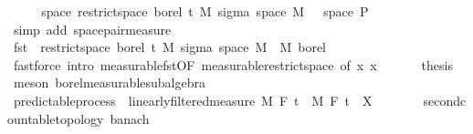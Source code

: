 \begin{isabellebody}
\ \ \isamarkupfalse%
\ \isamarkupfalse%
\ {\isachardoublequoteopen}space\ {\isacharparenleft}{\kern0pt}restrict{\isacharunderscore}{\kern0pt}space\ borel\ {\isacharbraceleft}{\kern0pt}t\ {\isasymOtimes}\isactrlsub M\ sigma\ {\isacharparenleft}{\kern0pt}space\ M{\isacharparenright}{\kern0pt}\ {\isacharbraceleft}{\kern0pt}{\isacharbraceright}{\kern0pt}{\isacharparenright}{\kern0pt}\ {\isacharequal}{\kern0pt}\ space\ {\isasymSigma}\isactrlsub P{\isachardoublequoteclose}\ \isamarkupfalse%
\ {\isacharparenleft}{\kern0pt}simp\ add{\isacharcolon}{\kern0pt}\ space{\isacharunderscore}{\kern0pt}pair{\isacharunderscore}{\kern0pt}measure{\isacharparenright}{\kern0pt}\isanewline
\ \ \isamarkupfalse%
\ \isamarkupfalse%
\ {\isachardoublequoteopen}fst\ {\isasymin}\ restrict{\isacharunderscore}{\kern0pt}space\ borel\ {\isacharbraceleft}{\kern0pt}t\ {\isasymOtimes}\isactrlsub M\ sigma\ {\isacharparenleft}{\kern0pt}space\ M{\isacharparenright}{\kern0pt}\ {\isacharbraceleft}{\kern0pt}{\isacharbraceright}{\kern0pt}\ {\isasymrightarrow}\isactrlsub M\ borel{\isachardoublequoteclose}\ \isamarkupfalse%
\ {\isacharparenleft}{\kern0pt}fastforce\ intro{\isacharcolon}{\kern0pt}\ measurable{\isacharunderscore}{\kern0pt}fst{\isacharprime}{\kern0pt}{\isacharprime}{\kern0pt}{\isacharbrackleft}{\kern0pt}OF\ measurable{\isacharunderscore}{\kern0pt}restrict{\isacharunderscore}{\kern0pt}space{}{\isacharcomma}{\kern0pt}\ of\ {\isachardoublequoteopen}{\isasymlambda}x{\isachardot}{\kern0pt}\ x{\isachardoublequoteclose}{\isacharbrackright}{\kern0pt}{\isacharparenright}{\kern0pt}\ \isanewline
\ \ \isamarkupfalse%
\ \isamarkupfalse%
\ {\isacharquery}{\kern0pt}thesis\ \isamarkupfalse%
\ {\isacharparenleft}{\kern0pt}meson\ borel{\isacharunderscore}{\kern0pt}measurable{\isacharunderscore}{\kern0pt}subalgebra{\isacharparenright}{\kern0pt}\isanewline
{}\isamarkupfalse%
%
\endisatagproof
{\isafoldproof}%
%
\isadelimproof
\isanewline
%
\endisadelimproof
\isanewline
{}\isamarkupfalse%
\isanewline
\isanewline
{}\isamarkupfalse%
\ predictable{\isacharunderscore}{\kern0pt}process\ {\isacharequal}{\kern0pt}\ linearly{\isacharunderscore}{\kern0pt}filtered{\isacharunderscore}{\kern0pt}measure\ M\ F\ t\ \ M\ F\ t\ \ X\ {\isacharcolon}{\kern0pt}{\isacharcolon}{\kern0pt}\ {\isachardoublequoteopen}{\isacharunderscore}{\kern0pt}\ {\isasymRightarrow}\ {\isacharunderscore}{\kern0pt}\ {\isasymRightarrow}\ {\isacharunderscore}{\kern0pt}\ {\isacharcolon}{\kern0pt}{\isacharcolon}{\kern0pt}\ {\isacharbraceleft}{\kern0pt}second{\isacharunderscore}{\kern0pt}countable{\isacharunderscore}{\kern0pt}topology{\isacharcomma}{\kern0pt}\ banach{\isacharbraceright}{\kern0pt}{\isachardoublequoteclose}\ {\isacharplus}{\kern0pt}\isanewline

\end{isabellebody}
